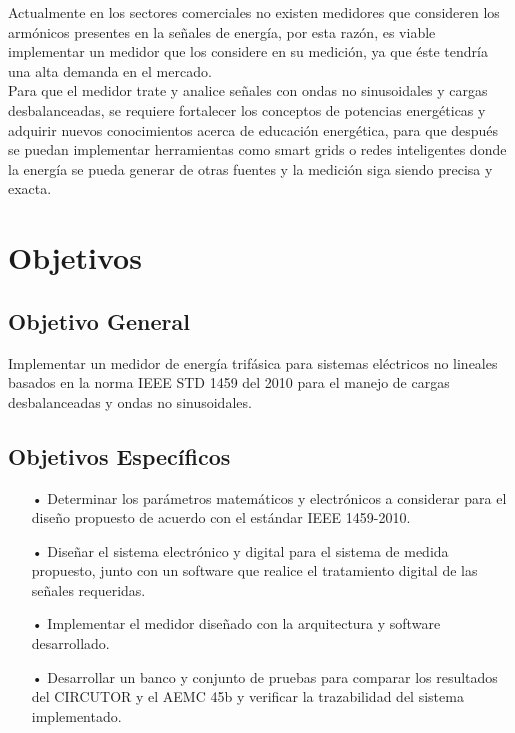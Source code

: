 Actualmente en los sectores comerciales no existen medidores que consideren los armónicos presentes en la señales de energía, por esta razón, es viable implementar un medidor que los considere en su medición, ya que éste tendría una alta demanda en el mercado. \\

Para que el medidor trate y analice señales con ondas no sinusoidales y cargas desbalanceadas, se requiere fortalecer los conceptos de potencias energéticas y adquirir nuevos conocimientos acerca de educación energética, para que después se puedan implementar herramientas como smart grids o redes inteligentes donde la energía se pueda generar de otras fuentes y la medición siga siendo precisa y exacta.


\newpage{\clearpage}
\chapter{ Objetivos}
\section{Objetivo General}

Implementar un medidor de energía trifásica para sistemas eléctricos no lineales basados en la norma IEEE STD 1459 del 2010 para el manejo de cargas desbalanceadas y ondas no sinusoidales.

\section{Objetivos Específicos}
\begin{itemize} 
\item[•]Determinar los parámetros matemáticos y electrónicos a considerar para el diseño propuesto de acuerdo con el estándar IEEE 1459-2010. 

\item[•]	Diseñar el sistema electrónico y digital para el sistema de medida propuesto, junto con un software que realice el tratamiento digital de las señales requeridas.

\item[•] Implementar el medidor diseñado con la arquitectura y software desarrollado.

\item[•] Desarrollar un banco y conjunto de pruebas para comparar los resultados del CIRCUTOR y el AEMC 45b y verificar la trazabilidad del sistema implementado. 
 
\end{itemize}



